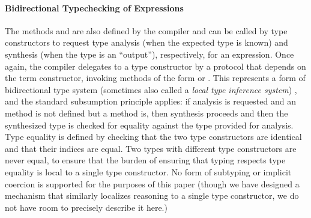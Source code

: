 
\paragraph{Bidirectional Typechecking of Expressions} The methods  and  are also defined by the compiler and can be called by type constructors to request type analysis (when the expected type is known) and synthesis (when the type is an ``output''), respectively, for an expression. Once again, the compiler delegates to a type constructor by a protocol that depends on the term constructor, invoking methods of the form  or . This represents a form of bidirectional type system (sometimes also called a \emph{local type inference system}) \cite{Pierce:2000:LTI:345099.345100}, and the standard subsumption principle applies: if analysis is requested and an  method is not defined but a  method is, then synthesis proceeds and then the synthesized type is checked for equality against the type provided for analysis. Type equality is defined by checking that the two type constructors are identical and that their indices are equal. Two types with different type constructors are never equal, to ensure that the burden of ensuring that typing respects type equality is local to a single type constructor.  No form of subtyping or implicit coercion is supported for the purposes of this paper (though we have designed a mechanism that similarly localizes reasoning to a single type constructor, we do not have room to precisely describe it here.)


